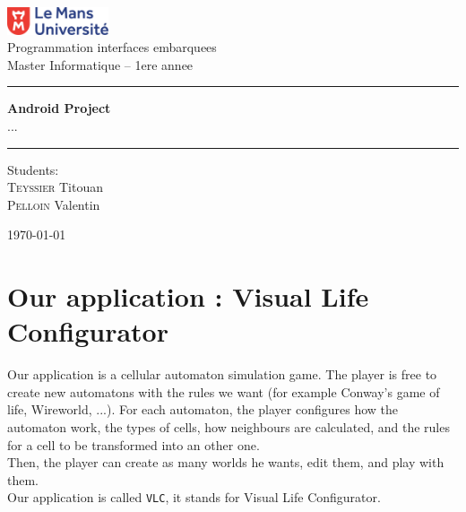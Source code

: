 \documentclass{report}
\begin{document}
\begin{titlepage}


		\begin{spacing}{1.5}
			\begin{minipage}{0.4\textwidth}
					\includegraphics[width=3cm]{logo.png}\\
					Programmation interfaces embarquees\\
					Master Informatique – 1ere annee
			\end{minipage}
						\vspace*{\fill}

		\end{spacing}
	

	
	\begin{center}
		\begin{spacing}{2}
		    \hrule \vspace{1cm}
			\textbf{\Huge Android Project}\\[0.5cm]
			...
			\vspace{1cm}
			\hrule

			\vspace*{\fill}
		\end{spacing}

		\begin{spacing}{1.15}
			\vspace{12pt}
			Students: \\
			\textsc{Teyssier} Titouan\\
			\textsc{Pelloin} Valentin\\
			\vspace*{\fill}
		\end{spacing}

		\begin{spacing}{1.15}
			\today
			\vspace*{\fill}
		\end{spacing}
		
	\end{center}
\end{titlepage}



\tableofcontents


\chapter{Our application : Visual Life Configurator}
Our application is a cellular automaton simulation game. The player is free to create new automatons with the rules we want (for example Conway's game of life, Wireworld, ...).
For each automaton, the player configures how the automaton work, the types of cells, how neighbours are calculated, and the rules for a cell to be transformed into an other one.\\
Then, the player can create as many worlds he wants, edit them, and play with them.\\
Our application is called \texttt{VLC}, it stands for Visual Life Configurator.
\end{document}
